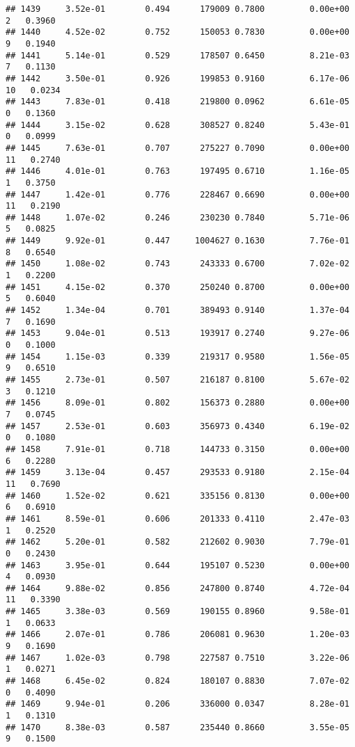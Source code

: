 \documentclass[
]{article}
\begin{document}
\begin{verbatim}
## 1439     3.52e-01        0.494      179009 0.7800         0.00e+00   2   0.3960
## 1440     4.52e-02        0.752      150053 0.7830         0.00e+00   9   0.1940
## 1441     5.14e-01        0.529      178507 0.6450         8.21e-03   7   0.1130
## 1442     3.50e-01        0.926      199853 0.9160         6.17e-06  10   0.0234
## 1443     7.83e-01        0.418      219800 0.0962         6.61e-05   0   0.1360
## 1444     3.15e-02        0.628      308527 0.8240         5.43e-01   0   0.0999
## 1445     7.63e-01        0.707      275227 0.7090         0.00e+00  11   0.2740
## 1446     4.01e-01        0.763      197495 0.6710         1.16e-05   1   0.3750
## 1447     1.42e-01        0.776      228467 0.6690         0.00e+00  11   0.2190
## 1448     1.07e-02        0.246      230230 0.7840         5.71e-06   5   0.0825
## 1449     9.92e-01        0.447     1004627 0.1630         7.76e-01   8   0.6540
## 1450     1.08e-02        0.743      243333 0.6700         7.02e-02   1   0.2200
## 1451     4.15e-02        0.370      250240 0.8700         0.00e+00   5   0.6040
## 1452     1.34e-04        0.701      389493 0.9140         1.37e-04   7   0.1690
## 1453     9.04e-01        0.513      193917 0.2740         9.27e-06   0   0.1000
## 1454     1.15e-03        0.339      219317 0.9580         1.56e-05   9   0.6510
## 1455     2.73e-01        0.507      216187 0.8100         5.67e-02   3   0.1210
## 1456     8.09e-01        0.802      156373 0.2880         0.00e+00   7   0.0745
## 1457     2.53e-01        0.603      356973 0.4340         6.19e-02   0   0.1080
## 1458     7.91e-01        0.718      144733 0.3150         0.00e+00   6   0.2280
## 1459     3.13e-04        0.457      293533 0.9180         2.15e-04  11   0.7690
## 1460     1.52e-02        0.621      335156 0.8130         0.00e+00   6   0.6910
## 1461     8.59e-01        0.606      201333 0.4110         2.47e-03   1   0.2520
## 1462     5.20e-01        0.582      212602 0.9030         7.79e-01   0   0.2430
## 1463     3.95e-01        0.644      195107 0.5230         0.00e+00   4   0.0930
## 1464     9.88e-02        0.856      247800 0.8740         4.72e-04  11   0.3390
## 1465     3.38e-03        0.569      190155 0.8960         9.58e-01   1   0.0633
## 1466     2.07e-01        0.786      206081 0.9630         1.20e-03   9   0.1690
## 1467     1.02e-03        0.798      227587 0.7510         3.22e-06   1   0.0271
## 1468     6.45e-02        0.824      180107 0.8830         7.07e-02   0   0.4090
## 1469     9.94e-01        0.206      336000 0.0347         8.28e-01   1   0.1310
## 1470     8.38e-03        0.587      235440 0.8660         3.55e-05   9   0.1500

\end{verbatim}
\end{document}
